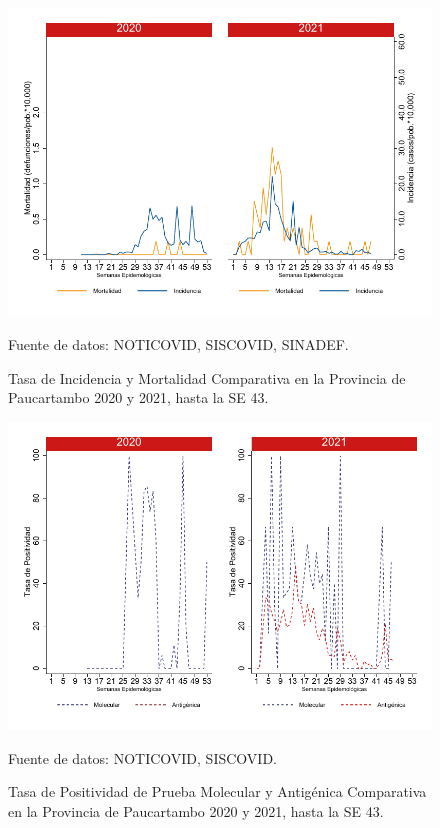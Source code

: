 \documentclass[12pt,a4paper,openany]{book}
\begin{document}
		\begin{figure}[h]
			\caption{Tasa de Incidencia y Mortalidad Comparativa en la Provincia de Paucartambo 2020 y 2021, hasta la SE 43.}\label{fig:inc_mort_paucartam}
			\begin{center}
				\includegraphics[width=0.7\linewidth]{../figuras/incidencia_mortalidad_20_21_11}
			\end{center}
			{\footnotesize {Fuente de datos: NOTICOVID, SISCOVID, SINADEF.}}
		\end{figure}
		
		\begin{figure}[h]
			\caption{Tasa de Positividad de Prueba Molecular y Antigénica Comparativa en la Provincia de Paucartambo 2020 y 2021, hasta la SE 43.}\label{fig:positividad_paucartam}
			\begin{center}
				\includegraphics[width=0.7\linewidth]{../figuras/positividad_20_21_11}
			\end{center}
			{\footnotesize {Fuente de datos: NOTICOVID, SISCOVID.}}
		\end{figure}
		
\end{document}
